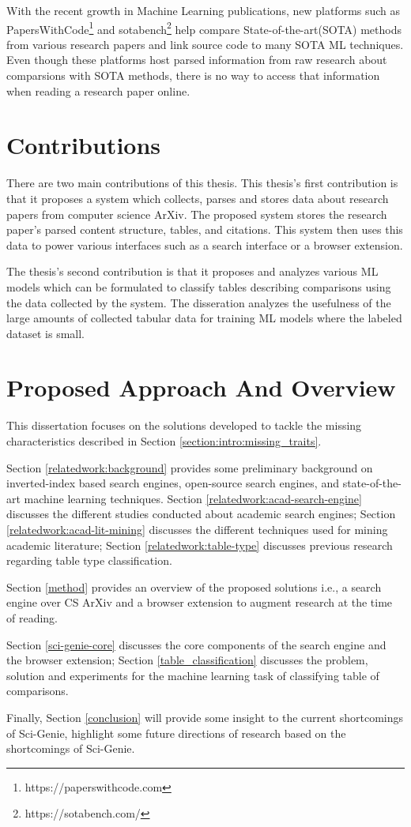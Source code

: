 With the recent growth in Machine Learning publications, new platforms such as PapersWithCode\footnote{https://paperswithcode.com} and sotabench\footnote{https://sotabench.com/} help compare State-of-the-art(SOTA) methods from various research papers and link source code to many SOTA ML techniques. Even though these platforms host parsed information from raw research about comparsions with SOTA methods, there is no way to access that information when reading a research paper online. 

\section{Contributions}
There are two main contributions of this thesis. This thesis's first contribution is that it proposes a system which collects, parses and stores data about research papers from computer science ArXiv. The proposed system stores the research paper's parsed content structure, tables, and citations. This system then uses this data to power various interfaces such as a search interface or a browser extension. 

The thesis's second contribution is that it proposes and analyzes various ML models which can be formulated to classify tables describing comparisons using the data collected by the system. The disseration analyzes the usefulness of the large amounts of collected tabular data for training ML models where the labeled dataset is small. 

\section{Proposed Approach And Overview}
This dissertation focuses on the solutions developed to tackle the missing characteristics described in Section \ref{section:intro:missing_traits}. 

Section \ref{relatedwork:background} provides some preliminary background on inverted-index based search engines, open-source search engines, and state-of-the-art machine learning techniques.
Section \ref{relatedwork:acad-search-engine} discusses the different studies conducted about academic search engines; Section \ref{relatedwork:acad-lit-mining} discusses the different techniques used for mining academic literature; Section \ref{relatedwork:table-type} discusses previous research regarding table type classification. 

Section \ref{method} provides an overview of the proposed solutions i.e., a search engine over CS ArXiv and a browser extension to augment research at the time of reading. 

Section \ref{sci-genie-core} discusses the core components of the search engine and the browser extension; Section \ref{table_classification} discusses the problem, solution and experiments for the machine learning task of classifying table of comparisons.

Finally, Section \ref{conclusion} will provide some insight to the current shortcomings of Sci-Genie, highlight some future directions of research based on the shortcomings of Sci-Genie. 